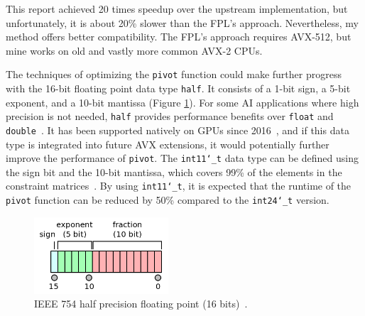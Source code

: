 \documentclass[logo,bsc,singlespacing,parskip]{infthesis}
\newcommand{\dthalfi}{\texttt{int11\char`_t}}
\newcommand{\dthalf}{\texttt{half}}
\newcommand{\dtfloat}{\texttt{float}}
\newcommand{\dtfloati}{\texttt{int24\char`_t}}
\newcommand{\dtdouble}{\texttt{double}}
\newcommand{\pivot}{\texttt{pivot}}
\begin{document}
This report achieved 20 times speedup over the upstream implementation, but unfortunately, it is about 20\% slower than the FPL's approach. Nevertheless, my method offers better compatibility. The FPL's approach requires AVX-512, but mine works on old and vastly more common AVX-2 CPUs.

The techniques of optimizing the \texttt{pivot} function could make further progress with the 16-bit floating point data type \dthalf{}. It consists of a 1-bit sign, a 5-bit exponent, and a 10-bit mantissa (Figure \ref{fig:ieee-f16}). For some AI applications where high precision is not needed, \dthalf{} provides performance benefits over \dtfloat{} and \dtdouble{}~\cite{fp16-fast}. It has been supported natively on GPUs since 2016~\cite{pascal-intro-fp16}, and if this data type is integrated into future AVX extensions, it would potentially further improve the performance of \pivot{}. The \dthalfi{} data type can be defined using the sign bit and the 10-bit mantissa, which covers 99\% of the elements in the constraint matrices~\cite{FPL1}. By using \dthalfi{}, it is expected that the runtime of the \pivot{} function can be reduced by 50\% compared to the \dtfloati{} version.


\begin{figure}[H]
    \begin{center}
    \includegraphics[width=50mm,scale=0.1]{image/ieee-f16.png}
    \end{center}
    \caption{IEEE 754 half precision floating point (16 bits)~\cite{fp16-diagram}.}
    \label{fig:ieee-f16}
\end{figure}
\end{document}
